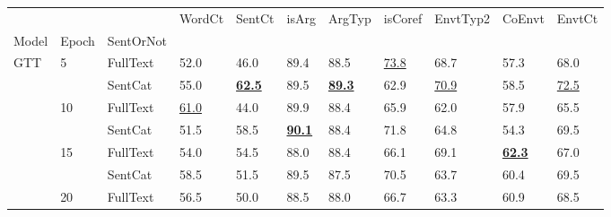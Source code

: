 \begin{tabular}{lllllllllll}
\toprule
    &    &          &                     WordCt &                     SentCt &                      isArg &                     ArgTyp &                    isCoref &                   EnvtTyp2 &                     CoEnvt &                     EnvtCt \\
Model & Epoch & SentOrNot &                            &                            &                            &                            &                            &                            &                            &                            \\
\midrule
GTT & 5 & FullText &                       52.0 &                       46.0 &                       89.4 &                       88.5 &           \underline{73.8} &                       68.7 &                       57.3 &                       68.0 \\
    &    & SentCat &                       55.0 &  \underline{\textbf{62.5}} &                       89.5 &  \underline{\textbf{89.3}} &                       62.9 &           \underline{70.9} &                       58.5 &           \underline{72.5} \\
    & 10 & FullText &           \underline{61.0} &                       44.0 &                       89.9 &                       88.4 &                       65.9 &                       62.0 &                       57.9 &                       65.5 \\
    &    & SentCat &                       51.5 &                       58.5 &  \underline{\textbf{90.1}} &                       88.4 &                       71.8 &                       64.8 &                       54.3 &                       69.5 \\
    & 15 & FullText &                       54.0 &                       54.5 &                       88.0 &                       88.4 &                       66.1 &                       69.1 &  \underline{\textbf{62.3}} &                       67.0 \\
    &    & SentCat &                       58.5 &                       51.5 &                       89.5 &                       87.5 &                       70.5 &                       63.7 &                       60.4 &                       69.5 \\
    & 20 & FullText &                       56.5 &                       50.0 &                       88.5 &                       88.0 &                       66.7 &                       63.3 &                       60.9 &                       68.5 \\

\end{tabular}
